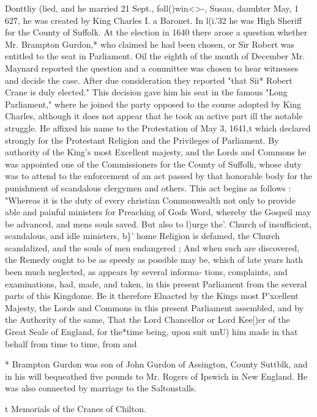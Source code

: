 \documentclass{book}
\begin{document}
Donttliy (lied, and he married 21 Sept., foll()win<>-, Susau, dauuhter 
May, 1 627, he was created by King Charles I. a Baronet. In l(i.'32 
he was High Sheriff for the County of Suffolk. At the election 
in 1640 there arose a question whether Mr. Brampton Gurdon,* 
who claimed he had been chosen, or Sir Robert was entitled to 
the seat in Parliament. Oil the eighth of the month of December 
Mr. Maynard reported the question and a committee was chosen 
to hear witnesses and decide the case. After due consideration 
they reported "that Sii* Robert Crane is duly elected." This 
decision gave him his seat in the famous "Long Parliament," 
where he joined the party opposed to the course adopted by King 
Charles, although it does not appear that he took an active part 
ill the notable struggle. He affixed his name to the Protestation 
of May 3, 1641,t which declared strongly for the Protestant 
Religion and the Privileges of Parliament. By authority of the 
King's most Excellent majesty, and the Lords and Commons 
he was appointed one of the Commissioners for the County of 
Suffolk, whose duty was to attend to the enforcement of an act 
passed by that honorable body for the punishment of scandalous 
clergymen and others. This act begins as follows : "Whereas it 
is the duty of every christian Commonwealth not only to provide 
able and painful ministers for Preaching of Gods Word, whereby 
the Gospeil may be advanced, and mens souls saved. But also to 
l)urge the'. Church of insufficient, scandalous, and idle ministers, 
b\}' home Religion is defamed, the Church scandalized, and the 
souls of men endangered ; And when such are discovered, the 
Remedy ought to be as speedy as possible may be, which of late 
years hath been much neglected, as appears by several informa- 
tions, complaints, and examinations, had, made, and taken, in 
this present Parliament from the several parts of this Kingdome. 
Be it therefore Elnacted by the Kings most P'xcellent Majesty, the 
Lords and Commons in this present Parliament assembled, and 
by the Authority of the same, That the Lord Chancellor or Lord 
Kee[)er of the Great Seale of England, for the*time being, upon 
suit unU) him made in that behalf from time to time, from and 



* Brampton Gurdon was son of John Gurdon of Assington, County 
Suttblk, and in his will bequeathed five pounds to Mr. Rogers of Ipswich 
in New England. He was also connected by marriage to the Saltonstalls. 

t Memorials of the Cranes of Chilton. 
\end{document}
